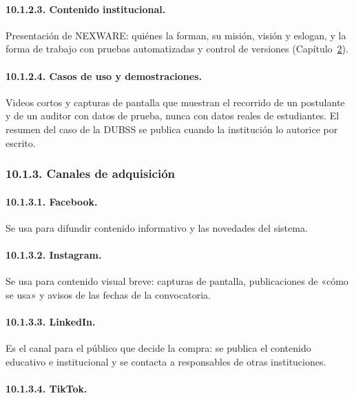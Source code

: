 \paragraph{10.1.2.3. Contenido institucional.}

Presentación de NEXWARE: quiénes la forman, su misión, visión y eslogan, y la forma de trabajo con pruebas automatizadas y control de versiones (Capítulo~\hyperref[cap:sqap]{2}).

\paragraph{10.1.2.4. Casos de uso y demostraciones.}

Videos cortos y capturas de pantalla que muestran el recorrido de un postulante y de un auditor con datos de prueba, nunca con datos reales de estudiantes. El resumen del caso de la DUBSS se publica cuando la institución lo autorice por escrito.

\subsubsection{10.1.3. Canales de adquisición}

\paragraph{10.1.3.1. Facebook.}

Se usa para difundir contenido informativo y las novedades del sistema.

\paragraph{10.1.3.2. Instagram.}

Se usa para contenido visual breve: capturas de pantalla, publicaciones de «cómo se usa» y avisos de las fechas de la convocatoria.

\paragraph{10.1.3.3. LinkedIn.}

Es el canal para el público que decide la compra: se publica el contenido educativo e institucional y se contacta a responsables de otras instituciones.

\paragraph{10.1.3.4. TikTok.}

